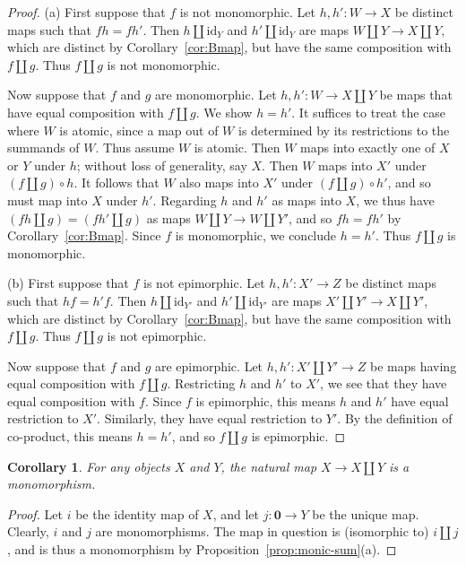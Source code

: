 \documentclass[12pt]{amsart}
\numberwithin{equation}{section}
\newtheorem{corollary}[equation]{Corollary}
\theoremstyle{definition}
\newcommand{\id}{\mathrm{id}}
\newcommand{\bzero}{\mathbf{0}}
\begin{document}
\begin{proof}
(a) First suppose that $f$ is not monomorphic. Let $h,h' \colon W \to X$ be distinct maps such that $fh=fh'$.  Then $h \amalg \id_Y$ and $h' \amalg \id_Y$ are maps $W \amalg Y \to X \amalg Y$, which are distinct by Corollary~\ref{cor:Bmap}, but have the same composition with $f \amalg g$. Thus $f \amalg g$ is not monomorphic.

Now suppose that $f$ and $g$ are monomorphic. Let $h,h' \colon W \to X \amalg Y$ be maps that have equal composition with $f \amalg g$. We show $h=h'$. It suffices to treat the case where $W$ is atomic, since a map out of $W$ is determined by its restrictions to the summands of $W$. Thus assume $W$ is atomic. Then $W$ maps into exactly one of $X$ or $Y$ under $h$; without loss of generality, say $X$. Then $W$ maps into $X'$ under $(f \amalg g) \circ h$. It follows that $W$ also maps into $X'$ under $(f \amalg g) \circ h'$, and so must map into $X$ under $h'$. Regarding $h$ and $h'$ as maps into $X$, we thus have $(fh \amalg g)=(fh' \amalg g)$ as maps $W \amalg Y \to W \amalg Y'$, and so $fh=fh'$ by Corollary~\ref{cor:Bmap}. Since $f$ is monomorphic, we conclude $h=h'$. Thus $f \amalg g$ is monomorphic.

(b) First suppose that $f$ is not epimorphic. Let $h,h' \colon X' \to Z$ be distinct maps such that $hf=h'f$. Then $h \amalg \id_{Y'}$ and $h' \amalg \id_{Y'}$ are maps $X' \amalg Y' \to X \amalg Y'$, which are distinct by Corollary~\ref{cor:Bmap}, but have the same composition with $f \amalg g$. Thus $f \amalg g$ is not epimorphic.

Now suppose that $f$ and $g$ are epimorphic. Let $h,h' \colon X' \amalg Y' \to Z$ be maps having equal composition with $f \amalg g$. Restricting $h$ and $h'$ to $X'$, we see that they have equal composition with $f$. Since $f$ is epimorphic, this means $h$ and $h'$ have equal restriction to $X'$. Similarly, they have equal restriction to $Y'$. By the definition of co-product, this means $h=h'$, and so $f \amalg g$ is epimorphic.
\end{proof}

\begin{corollary} \label{cor:monic-sum}
For any objects $X$ and $Y$, the natural map $X \to X \amalg Y$ is a monomorphism.
\end{corollary}

\begin{proof}
Let $i$ be the identity map of $X$, and let $j \colon \bzero \to Y$ be the unique map. Clearly, $i$ and $j$ are monomorphisms. The map in question is (isomorphic to) $i \amalg j$, and is thus a monomorphism by Proposition~\ref{prop:monic-sum}(a).
\end{proof}
\end{document}
